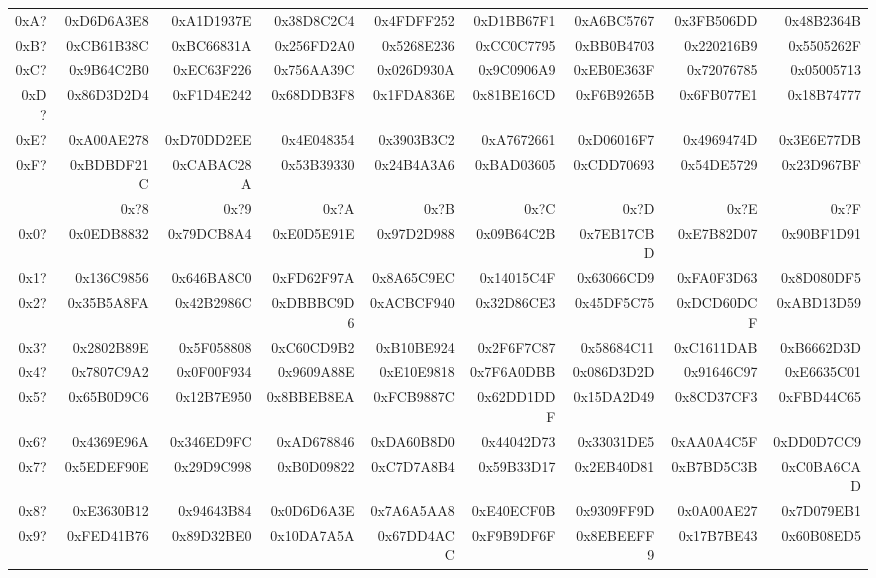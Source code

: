 \begin{table}[h]
{\begin{tabular}{|r||r|r|r|r|r|r|r|r|}
0xA? &
0xD6D6A3E8 &  0xA1D1937E &  0x38D8C2C4 &  0x4FDFF252 &  0xD1BB67F1 &  0xA6BC5767 &  0x3FB506DD &  0x48B2364B \\
0xB? &
0xCB61B38C &  0xBC66831A &  0x256FD2A0 &  0x5268E236 &  0xCC0C7795 &  0xBB0B4703 &  0x220216B9 &  0x5505262F \\
0xC? &
0x9B64C2B0 &  0xEC63F226 &  0x756AA39C &  0x026D930A &  0x9C0906A9 &  0xEB0E363F &  0x72076785 &  0x05005713 \\
0xD? &
0x86D3D2D4 &  0xF1D4E242 &  0x68DDB3F8 &  0x1FDA836E &  0x81BE16CD &  0xF6B9265B &  0x6FB077E1 &  0x18B74777 \\
0xE? &
0xA00AE278 &  0xD70DD2EE &  0x4E048354 &  0x3903B3C2 &  0xA7672661 &  0xD06016F7 &  0x4969474D &  0x3E6E77DB \\
0xF? &
0xBDBDF21C &  0xCABAC28A &  0x53B39330 &  0x24B4A3A6 &  0xBAD03605 &  0xCDD70693 &  0x54DE5729 &  0x23D967BF \\
\hline
\hline
 & 0x?8 & 0x?9 & 0x?A & 0x?B & 0x?C & 0x?D & 0x?E & 0x?F \\
\hline
0x0? &
0x0EDB8832 &  0x79DCB8A4 &  0xE0D5E91E &  0x97D2D988 &  0x09B64C2B &  0x7EB17CBD &  0xE7B82D07 &  0x90BF1D91 \\
0x1? &
0x136C9856 &  0x646BA8C0 &  0xFD62F97A &  0x8A65C9EC &  0x14015C4F &  0x63066CD9 &  0xFA0F3D63 &  0x8D080DF5 \\
0x2? &
0x35B5A8FA &  0x42B2986C &  0xDBBBC9D6 &  0xACBCF940 &  0x32D86CE3 &  0x45DF5C75 &  0xDCD60DCF &  0xABD13D59 \\
0x3? &
0x2802B89E &  0x5F058808 &  0xC60CD9B2 &  0xB10BE924 &  0x2F6F7C87 &  0x58684C11 &  0xC1611DAB &  0xB6662D3D \\
0x4? &
0x7807C9A2 &  0x0F00F934 &  0x9609A88E &  0xE10E9818 &  0x7F6A0DBB &  0x086D3D2D &  0x91646C97 &  0xE6635C01 \\
0x5? &
0x65B0D9C6 &  0x12B7E950 &  0x8BBEB8EA &  0xFCB9887C &  0x62DD1DDF &  0x15DA2D49 &  0x8CD37CF3 &  0xFBD44C65 \\
0x6? &
0x4369E96A &  0x346ED9FC &  0xAD678846 &  0xDA60B8D0 &  0x44042D73 &  0x33031DE5 &  0xAA0A4C5F &  0xDD0D7CC9 \\
0x7? &
0x5EDEF90E &  0x29D9C998 &  0xB0D09822 &  0xC7D7A8B4 &  0x59B33D17 &  0x2EB40D81 &  0xB7BD5C3B &  0xC0BA6CAD \\
0x8? &
0xE3630B12 &  0x94643B84 &  0x0D6D6A3E &  0x7A6A5AA8 &  0xE40ECF0B &  0x9309FF9D &  0x0A00AE27 &  0x7D079EB1 \\
0x9? &
0xFED41B76 &  0x89D32BE0 &  0x10DA7A5A &  0x67DD4ACC &  0xF9B9DF6F &  0x8EBEEFF9 &  0x17B7BE43 &  0x60B08ED5 \\

\end{tabular}}
\end{table}
